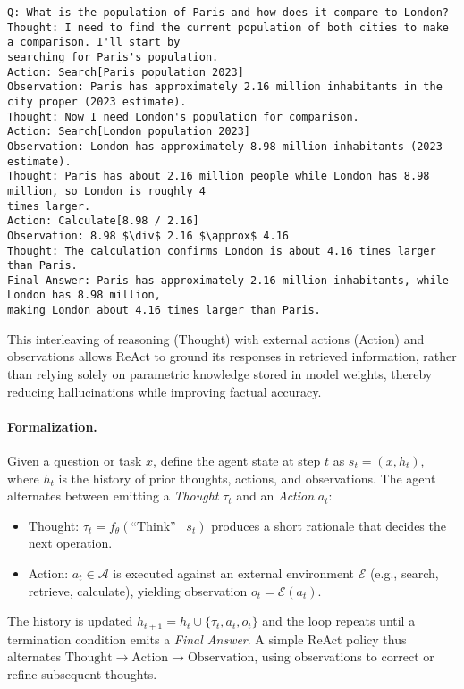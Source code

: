 \begin{lstlisting}[language={},breaklines=true,basicstyle=\ttfamily\footnotesize,caption={ReAct Example: Population Comparison Query}]
Q: What is the population of Paris and how does it compare to London?
Thought: I need to find the current population of both cities to make a comparison. I'll start by 
searching for Paris's population.
Action: Search[Paris population 2023]
Observation: Paris has approximately 2.16 million inhabitants in the city proper (2023 estimate).
Thought: Now I need London's population for comparison.
Action: Search[London population 2023]
Observation: London has approximately 8.98 million inhabitants (2023 estimate).
Thought: Paris has about 2.16 million people while London has 8.98 million, so London is roughly 4 
times larger.
Action: Calculate[8.98 / 2.16]
Observation: 8.98 $\div$ 2.16 $\approx$ 4.16
Thought: The calculation confirms London is about 4.16 times larger than Paris.
Final Answer: Paris has approximately 2.16 million inhabitants, while London has 8.98 million, 
making London about 4.16 times larger than Paris.
\end{lstlisting}

This interleaving of reasoning (Thought) with external actions (Action) and observations allows ReAct to ground its responses in retrieved information, rather than relying solely on parametric knowledge stored in model weights, thereby reducing hallucinations while improving factual accuracy.

\paragraph{Formalization.} Given a question or task $x$, define the agent state at step $t$ as $s_t = (x, h_t)$, where $h_t$ is the history of prior thoughts, actions, and observations. The agent alternates between emitting a \textit{Thought} $\tau_t$ and an \textit{Action} $a_t$:
\begin{itemize}
    \item Thought: $\tau_t = f_\theta(\text{``Think''} \mid s_t)$ produces a short rationale that decides the next operation.
    \item Action: $a_t \in \mathcal{A}$ is executed against an external environment $\mathcal{E}$ (e.g., search, retrieve, calculate), yielding observation $o_t = \mathcal{E}(a_t)$.
\end{itemize}
The history is updated $h_{t+1} = h_t \cup \{\tau_t, a_t, o_t\}$ and the loop repeats until a termination condition emits a \textit{Final Answer}. A simple ReAct policy thus alternates $\text{Thought} \rightarrow \text{Action} \rightarrow \text{Observation}$, using observations to correct or refine subsequent thoughts.


